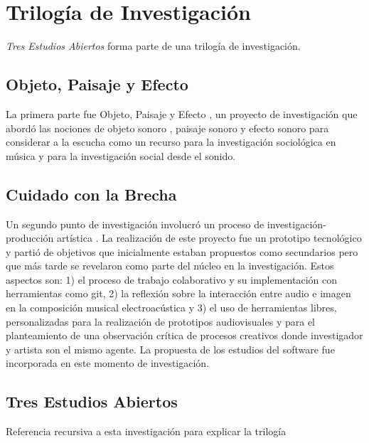 

\section{Trilogía de Investigación}

\textit{Tres Estudios Abiertos} forma parte de una trilogía de investigación.

\subsection{Objeto, Paisaje y Efecto}

La primera parte fue Objeto, Paisaje y Efecto \citep{ocelotlLic}, un proyecto de investigación que abordó las nociones de objeto sonoro \citep{schaeffer}, paisaje sonoro\citep{schafer1} y efecto sonoro \citep{augoyard} para considerar a la escucha como un recurso para la investigación sociológica en música y para la investigación social desde el sonido.

\subsection{Cuidado con la Brecha}

Un segundo punto de investigación involucró un proceso de investigación-producción artística \citep{ocelotlMas}. La realización de este proyecto fue un prototipo tecnológico y partió de objetivos que inicialmente estaban propuestos como secundarios pero que más tarde se revelaron como parte del núcleo en la investigación. Estos aspectos son: 1) el proceso de trabajo colaborativo y su implementación con herramientas como git, 2) la reflexión sobre la interacción entre audio e imagen en la composición musical electroacústica y 3) el uso de herramientas libres, personalizadas para la realización de prototipos audiovisuales y para el planteamiento de una observación crítica de procesos creativos donde investigador y artista son el mismo agente. La propuesta de los estudios del software fue incorporada en este momento de investigación. 

\subsection{Tres Estudios Abiertos}

Referencia recursiva a esta investigación para explicar la trilogía


